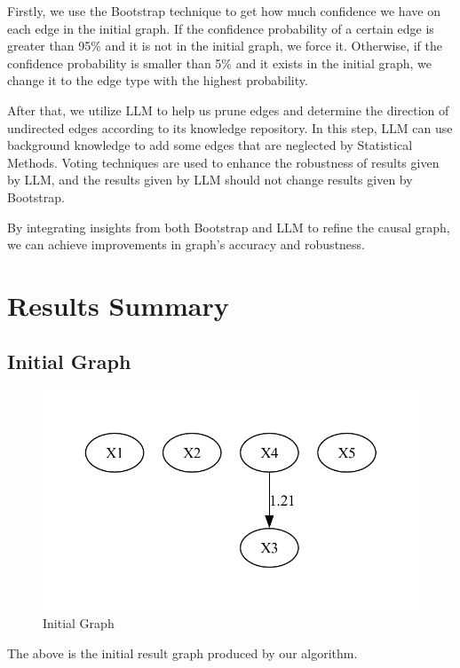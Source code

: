 \documentclass{article}
\begin{document}
Firstly, we use the Bootstrap technique to get how much confidence we have on each edge in the initial graph.
If the confidence probability of a certain edge is greater than 95\% and it is not in the initial graph, we force it.
Otherwise, if the confidence probability is smaller than 5\% and it exists in the initial graph, we change it to the edge type with the highest probability.
            
After that, we utilize LLM to help us prune edges and determine the direction of undirected edges according to its knowledge repository.
In this step, LLM can use background knowledge to add some edges that are neglected by Statistical Methods.
Voting techniques are used to enhance the robustness of results given by LLM, and the results given by LLM should not change results given by Bootstrap.

By integrating insights from both Bootstrap and LLM to refine the causal graph, we can achieve improvements in graph's accuracy and robustness.
            

\section{Results Summary}

\subsection{Initial Graph}

\begin{figure}[H]
    \centering
    \includegraphics[height=0.3\textheight]{./demo_data/20241104_155654/Linear_Nongaussian_data/output_graph/initial_graph.pdf}
    \caption{Initial Graph}
\end{figure}

The above is the initial result graph produced by our algorithm.
\end{document}
